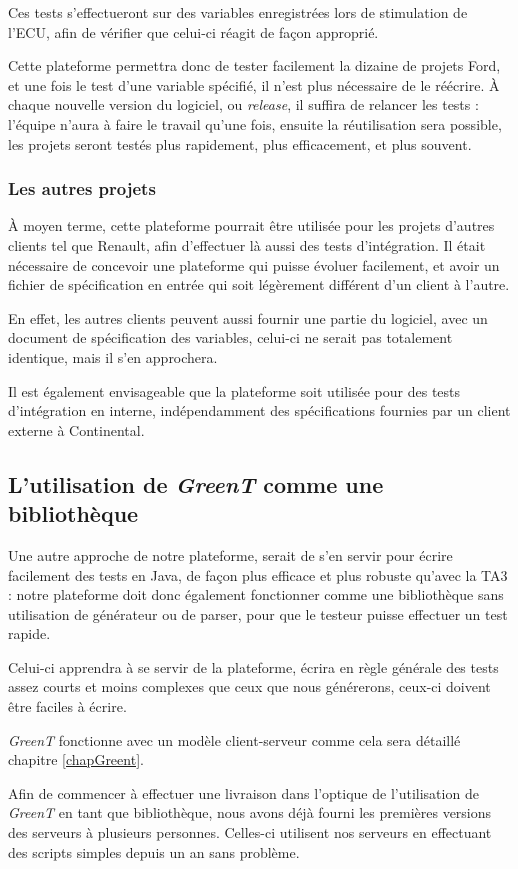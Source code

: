 	Ces tests s'effectueront sur des variables enregistrées lors de stimulation de l'ECU, afin de vérifier que celui-ci réagit de façon approprié.

	Cette plateforme permettra donc de tester facilement la dizaine de projets Ford, et une fois le test d'une variable spécifié, il n'est plus nécessaire de le réécrire. À chaque nouvelle version du logiciel, ou \textit{release}, il suffira de relancer les tests : l'équipe n'aura à faire le travail qu'une fois, ensuite la réutilisation sera possible, les projets seront testés plus rapidement, plus efficacement, et plus souvent.

	\subsubsection{Les autres projets}
	À moyen terme, cette plateforme pourrait être utilisée pour les projets d'autres clients tel que Renault, afin d'effectuer là aussi des tests d'intégration. Il était nécessaire de concevoir une plateforme qui puisse évoluer facilement, et avoir un fichier de spécification en entrée qui soit légèrement différent d'un client à l'autre.

	En effet, les autres clients peuvent aussi fournir une partie du logiciel, avec un document de spécification des variables, celui-ci ne serait pas totalement identique, mais il s'en approchera.

	Il est également envisageable que la plateforme soit utilisée pour des tests d'intégration en interne, indépendamment des spécifications fournies par un client externe à Continental.
	\newpage
	\subsection{L'utilisation de \textit{GreenT} comme une bibliothèque}
	Une autre approche de notre plateforme, serait de s'en servir pour écrire facilement des tests en Java, de façon plus efficace et plus robuste qu'avec la TA3 : notre plateforme doit donc également fonctionner comme une bibliothèque sans utilisation de générateur ou de parser, pour que le testeur puisse effectuer un test rapide. 

	Celui-ci apprendra à se servir de la plateforme, écrira en règle générale des tests assez courts et moins complexes que ceux que nous générerons, ceux-ci doivent être faciles à écrire.

\begin{remarque}
	\textit{GreenT} fonctionne avec un modèle client-serveur comme cela sera détaillé chapitre \ref{chapGreent}.
	
	 Afin de commencer à effectuer une livraison dans l'optique de l'utilisation de \textit{GreenT} en tant que bibliothèque, nous avons déjà fourni les premières versions des serveurs à plusieurs personnes. Celles-ci utilisent nos serveurs en effectuant des scripts simples depuis un an sans problème.
\end{remarque}
